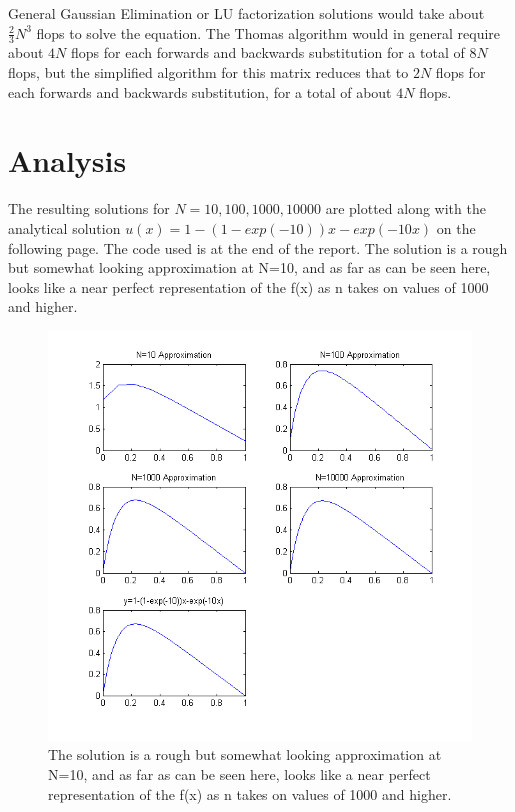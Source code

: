 \documentclass[11pt]{article}
\begin{document}
General Gaussian Elimination or LU factorization solutions would take about $\frac{2}{3}N^3$ flops to solve the equation. The Thomas algorithm would in general require about $4N$ flops for each forwards and backwards substitution for a total of $8N$ flops, but the simplified algorithm for this matrix reduces that to $2N$ flops for each forwards and backwards substitution, for a total of about $4N$ flops.

\section{Analysis}

The resulting solutions for $N=10,100,1000,10000$ are plotted along with the analytical solution $u(x)=1-(1-exp(-10))x-exp(-10x)$ on the following page. The code used is at the end of the report. The solution is a rough but somewhat looking approximation at N=10, and as far as can be seen here, looks like a near perfect representation of the f(x) as n takes on values of 1000 and higher.

\begin{figure}
	\includegraphics[width=\linewidth]{variousNplots}
	\caption{The solution is a rough but somewhat looking approximation at N=10, and as far as can be seen here, looks like a near perfect representation of the f(x) as n takes on values of 1000 and higher.}
\end{figure}
\end{document}
